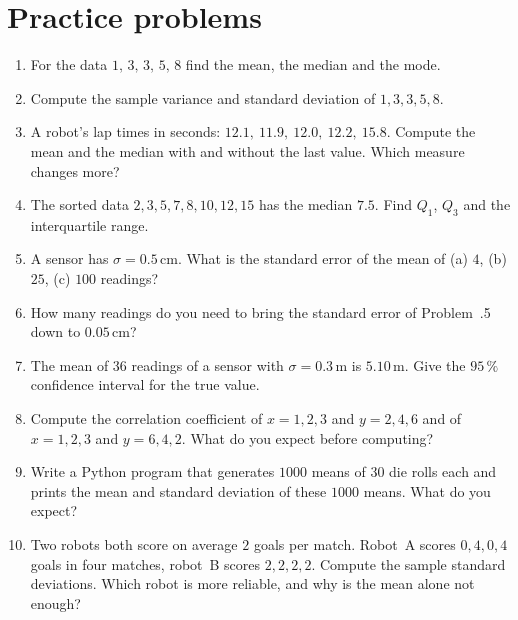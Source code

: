 \section*{Practice problems}
\begin{enumerate}[label=\textbf{\thechapter.\arabic*}]
  \item For the data $1,\,3,\,3,\,5,\,8$ find the mean, the median and the mode.
  \item Compute the sample variance and standard deviation of $1,3,3,5,8$.
  \item A robot's lap times in seconds: $12.1,\ 11.9,\ 12.0,\ 12.2,\ 15.8$. Compute the mean and the median with and without the last value. Which measure changes more?
  \item The sorted data $2,3,5,7,8,10,12,15$ has the median $7.5$. Find $Q_1$, $Q_3$ and the interquartile range.
  \item A sensor has $\sigma=0.5$\,cm. What is the standard error of the mean of (a) $4$, (b) $25$, (c) $100$ readings?
  \item How many readings do you need to bring the standard error of Problem~\thechapter.5 down to $0.05$\,cm?
  \item The mean of $36$ readings of a sensor with $\sigma=0.3$\,m is $5.10$\,m. Give the $95\,\%$ confidence interval for the true value.
  \item Compute the correlation coefficient of $x=1,2,3$ and $y=2,4,6$ and of $x=1,2,3$ and $y=6,4,2$. What do you expect before computing?
  \item Write a Python program that generates $1000$ means of $30$ die rolls each and prints the mean and standard deviation of these $1000$ means. What do you expect?
  \item[\textbf{\thechapter.10}$\star$] Two robots both score on average $2$ goals per match. Robot~A scores $0,4,0,4$ goals in four matches, robot~B scores $2,2,2,2$. Compute the sample standard deviations. Which robot is more reliable, and why is the mean alone not enough?
\end{enumerate}
